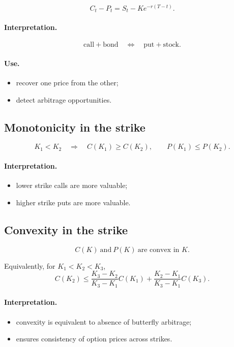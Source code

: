 \documentclass[11pt]{article}
\newcommand{\1}{\mathbf{1}}
\theoremstyle{plain}
\theoremstyle{definition}
\theoremstyle{remark}
\begin{document}
\[
\boxed{
C_t - P_t = S_t - K e^{-r(T-t)}.
}
\]

\paragraph{Interpretation.}
\[
\text{call} + \text{bond}
\quad\Longleftrightarrow\quad
\text{put} + \text{stock}.
\]

\paragraph{Use.}
\begin{itemize}[leftmargin=1.4em]
\item recover one price from the other;
\item detect arbitrage opportunities.
\end{itemize}

\subsection{Monotonicity in the strike}

\[
K_1<K_2
\quad\Rightarrow\quad
\boxed{
C(K_1)\ge C(K_2),
\qquad
P(K_1)\le P(K_2).
}
\]

\paragraph{Interpretation.}
\begin{itemize}[leftmargin=1.4em]
\item lower strike calls are more valuable;
\item higher strike puts are more valuable.
\end{itemize}

\subsection{Convexity in the strike}

\[
\boxed{
C(K)\ \text{and}\ P(K)\ \text{are convex in }K.
}
\]

Equivalently, for \(K_1<K_2<K_3\),
\[
C(K_2)
\le
\frac{K_3-K_2}{K_3-K_1}C(K_1)
+
\frac{K_2-K_1}{K_3-K_1}C(K_3).
\]

\paragraph{Interpretation.}
\begin{itemize}[leftmargin=1.4em]
\item convexity is equivalent to absence of butterfly arbitrage;
\item ensures consistency of option prices across strikes.
\end{itemize}
\end{document}
